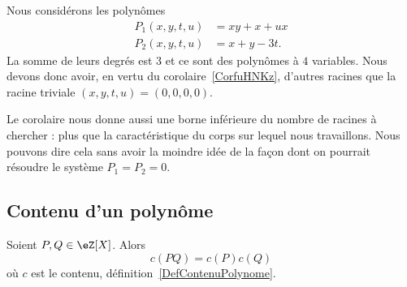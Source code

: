 \begin{example}
	Nous considérons les polynômes
	\begin{subequations}
		\begin{align}
			P_1(x,y,t,u) & = xy+x+ux \\
			P_2(x,y,t,u) & = x+y-3t.
		\end{align}
	\end{subequations}
	La somme de leurs degrés est \( 3\) et ce sont des polynômes à \( 4\) variables. Nous devons donc avoir, en vertu du corolaire~\ref{CorfuHNKz}, d'autres racines que la racine triviale \( (x,y,t,u)=(0,0,0,0)\).

	Le corolaire nous donne aussi une borne inférieure du nombre de racines à chercher : plus que la caractéristique du corps sur lequel nous travaillons. Nous pouvons dire cela sans avoir la moindre idée de la façon dont on pourrait résoudre le système \( P_1=P_2=0\).
\end{example}

\subsection{Contenu d'un polynôme}

\begin{lemma}   \label{LemHULrVaF}
	Soient \( P,Q\in \eZ[X]\). Alors
	\begin{equation}
		c(PQ)=c(P)c(Q)
	\end{equation}
	où \( c\) est le contenu, définition~\ref{DefContenuPolynome}.
\end{lemma}

